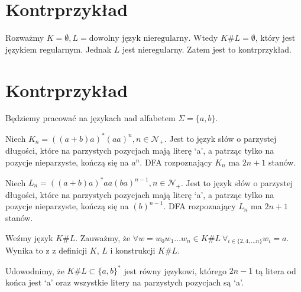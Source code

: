 \documentclass{article}
\theoremstyle{definition}
\theoremstyle{remark}
\begin{document}
\section{Kontrprzykład}

Rozważmy \(K = \emptyset, L = \text{dowolny język nieregularny}\). Wtedy
\(K \# L = \emptyset\), który jest językiem regularnym. Jednak \(L\)
jest nieregularny. Zatem jest to kontrprzykład.

\section{Kontrprzykład}

Będziemy pracować na językach nad alfabetem \(\Sigma = \{a, b\}\).

Niech \(K_n = ( (a+b)a )^* (aa)^n, n \in \mathcal{N_+}\). Jest to język słów o parzystej długości,
które na parzystych pozycjach mają literę `a', a patrząc tylko na pozycje nieparzyste, kończą się na \(a^n\).
DFA rozpoznający \(K_n\) ma \(2n+1\) stanów.





Niech \(L_n = ( (a+b)a )^* aa (ba)^{n-1}, n \in \mathcal{N_+}\). Jest to język słów o parzystej długości,
które na parzystych pozycjach mają literę `a', a patrząc tylko na pozycje nieparzyste, kończą się na \( (b)^{n-1}\).
DFA rozpoznający \(L_n\) ma \(2n+1\) stanów.

Weźmy język \(K \# L\). Zauważmy, że \( \forall w= w_0 w_1 \ldots w_n \in K \# L \ \forall_{i \in \{ 2, 4, \ldots n \} } w_i = a\). Wynika to z z definicji
\(K\), \(L\) i konstrukcji \(K \# L\).

Udowodnimy, że \(K \# L \subset \{ a, b \}^*\) jest równy językowi, którego \(2n-1\) tą litera od końca jest `a' oraz
wszystkie litery na parzystych pozycjach są `a'.
\end{document}

